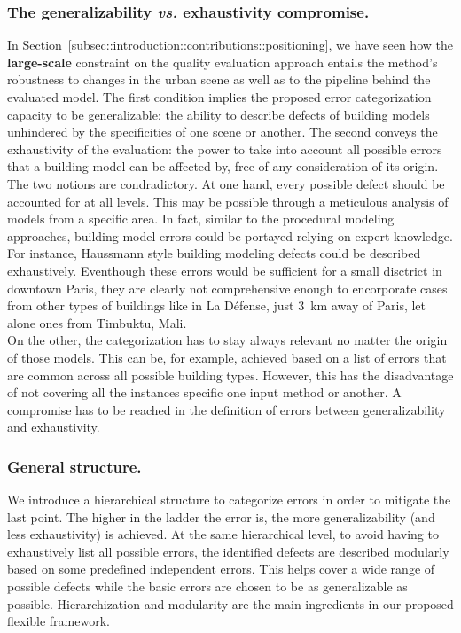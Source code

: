         \subsubsection{The generalizability \textit{vs.} exhaustivity compromise.}
            In Section~\ref{subsec::introduction::contributions::positioning}, we have seen how the \textbf{large-scale} constraint on the quality evaluation approach entails the method's robustness to changes in the urban scene as well as to the pipeline behind the evaluated model.
            The first condition implies the proposed error categorization capacity to be generalizable: the ability to describe defects of building models unhindered by the specificities of one scene or another.
            The second conveys the exhaustivity of the evaluation: the power to take into account all possible errors that a building model can be affected by, free of any consideration of its origin.\\

            The two notions are condradictory.
            At one hand, every possible defect should be accounted for at all levels.
            This may be possible through a meticulous analysis of models from a specific area.
            In fact, similar to the procedural modeling approaches, building model errors could be portayed relying on expert knowledge.
            For instance, Haussmann style building modeling defects could be described exhaustively.
            Eventhough these errors would be sufficient for a small disctrict in downtown Paris, they are clearly not comprehensive enough to encorporate cases from other types of buildings like in La D\'efense, just \SI{3}{\km} away of Paris, let alone ones from Timbuktu, Mali.\\

            On the other, the categorization has to stay always relevant no matter the origin of those models.
            This can be, for example, achieved based on a list of errors that are common across all possible building types.
            However, this has the disadvantage of not covering all the instances specific one input method or another.
            A compromise has to be reached in the definition of errors between generalizability and exhaustivity.
        
        \subsubsection{General structure.}
            We introduce a hierarchical structure to categorize errors in order to mitigate the last point.
            The higher in the ladder the error is, the more generalizability (and less exhaustivity) is achieved.
            At the same hierarchical level, to avoid having to exhaustively list all possible errors, the identified defects are described modularly based on some predefined independent errors.
            This helps cover a wide range of possible defects while the basic errors are chosen to be as generalizable as possible.
            Hierarchization and modularity are the main ingredients in our proposed flexible framework.\\

